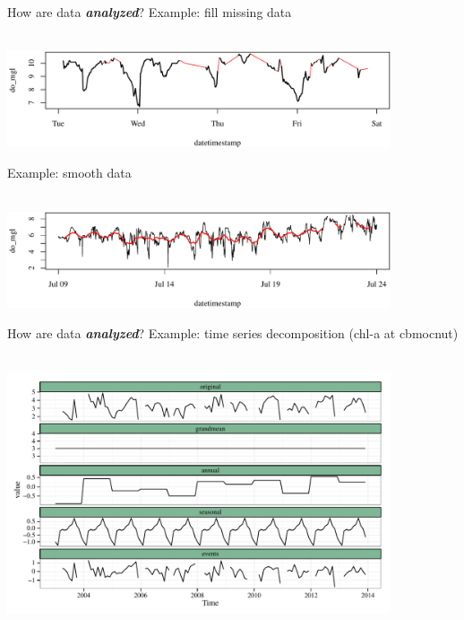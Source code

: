 \documentclass[serif]{beamer}\usepackage[]{graphicx}\usepackage[]{color}
\newenvironment{knitrout}{}{} %
\newcommand{\Bigtxt}[1]{\textbf{\textit{#1}}}
\begin{document}
\begin{frame}[fragile]{How are data \Bigtxt{analyzed}?}
Example: fill missing data \\~\\
\begin{knitrout}\scriptsize
{}\color{fgcolor}

{\centering \includegraphics[width=0.85\textwidth]{fig//filled-1} 

}



\end{knitrout}
Example: smooth data \\~\\
\begin{knitrout}\scriptsize
{}\color{fgcolor}

{\centering \includegraphics[width=0.85\textwidth]{fig//smooth-1} 

}



\end{knitrout}
\end{frame}

\begin{frame}[fragile]{How are data \Bigtxt{analyzed}?}
Example: time series decomposition (chl-a at cbmocnut)\\~\\
\begin{knitrout}
\color{fgcolor}

{\centering \includegraphics[width=0.85\textwidth]{fig/decomp_dep-1} 

}



\end{knitrout}
\end{frame}
\end{document}

